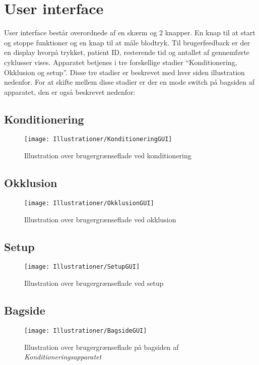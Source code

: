 \chapter{User interface}
User interface består overordnede af en skærm og 2 knapper. En knap til at start og stoppe funktioner og en knap til at måle blodtryk. Til brugerfeedback er der en display hvorpå trykket, patient ID, resterende tid og antallet af gennemførte cyklusser vises. Apparatet betjenes i tre forskellige stadier “Konditionering, Okklusion og setup”. Disse tre stadier er beskrevet med hver siden illustration nedenfor. For at skifte mellem disse stadier er der en mode switch på bagsiden af apparatet, den er også beskrevet nedenfor: 

\section{Konditionering}
\begin{figure}[H]
	\texttt{[image: Illustrationer/KonditioneringGUI]}
	\caption{Illustration over brugergrænseflade ved konditionering}
\end{figure}

\section{Okklusion}
\begin{figure}[H]
	\texttt{[image: Illustrationer/OkklusionGUI]}	
	\caption{Illustration over brugergrænseflade ved okklusion}
\end{figure}


\section{Setup}
\begin{figure}[H]
	\texttt{[image: Illustrationer/SetupGUI]}
	\caption{Illustration over brugergrænseflade ved setup}
\end{figure}


\section{Bagside}
\begin{figure}[H]
	\texttt{[image: Illustrationer/BagsideGUI]}	
	\caption{Illustration over brugergrænseflade på bagsiden af \textit{Konditioneringsapparatet} }
\end{figure}

\label{lastPage}
